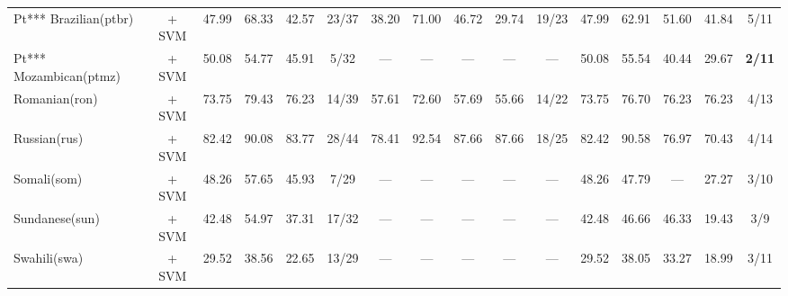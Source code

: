 \begin{table*}[h]
{\begin{tabular}{l|c|cccc|ccccc|ccccc}
            Pt*** Brazilian(ptbr)  & \citep{souza2020bertimbau} + SVM                                       & 47.99                        & 68.33                        & 42.57                       & 23/37         & 38.20         & 71.00        & 46.72          & 29.74         & 19/23         & 47.99          & 62.91          & 51.60          & 41.84         & 5/11          \\
            Pt*** Mozambican(ptmz) & \citep{wang2024multilingual}   + SVM                                   & 50.08                        & 54.77                        & 45.91                       & 5/32          & —             & —            & —              & —             & —             & 50.08          & 55.54          & 40.44          & 29.67         & \textbf{2/11} \\
            Romanian(ron)          & \citep{wang2024multilingual}     + SVM                                 & 73.75                        & 79.43                        & 76.23                       & 14/39         & 57.61         & 72.60        & 57.69          & 55.66         & 14/22         & 73.75          & 76.70          & 76.23          & 76.23         & 4/13          \\
            Russian(rus)           & \citep{snegirev2025russianfocusedembeddersexplorationrumteb}     + SVM & 82.42                        & 90.08                        & 83.77                       & 28/44         & 78.41         & 92.54        & 87.66          & 87.66         & 18/25         & 82.42          & 90.58          & 76.97          & 70.43         & 4/14          \\
            Somali(som)            & \citep{wang2024multilingual}       + SVM                               & 48.26                        & 57.65                        & 45.93                       & 7/29          & —             & —            & —              & —             & —             & 48.26          & 47.79          & —              & 27.27         & 3/10          \\
            Sundanese(sun)         & \citep{wang2024multilingual}      + SVM                                & 42.48                        & 54.97                        & 37.31                       & 17/32         & —             & —            & —              & —             & —             & 42.48          & 46.66          & 46.33          & 19.43         & 3/9           \\
            Swahili(swa)           & \citep{wang2024multilingual}      + SVM                                & 29.52                        & 38.56                        & 22.65                       & 13/29         & —             & —            & —              & —             & —             & 29.52          & 38.05          & 33.27          & 18.99         & 3/11          \\

\end{tabular}}
\end{table*}
